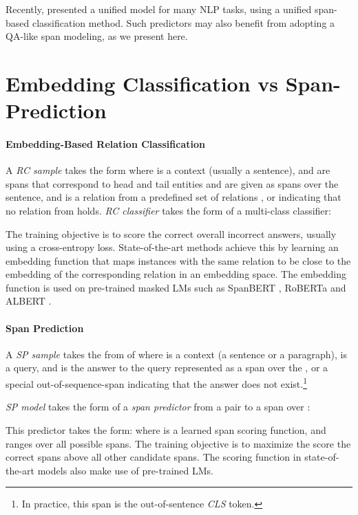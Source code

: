 \documentclass[11pt]{article}
\begin{document}
Recently, \citet{Jiang2019} presented a unified model for many NLP tasks, using a unified span-based classification method. Such predictors may also benefit from adopting a QA-like span modeling, as we present here.













\section{Embedding Classification vs Span-Prediction}
\paragraph{Embedding-Based Relation Classification} \label{ssec:rc}
A \emph{RC sample} takes the form  where  is a context (usually a sentence),  and  are spans that correspond to head and tail entities and are given as spans over the sentence, and  is a relation from a predefined set of relations , or  indicating that no relation from  holds.
\emph{RC classifier} takes the form of a multi-class classifier:

\noindent The training objective is to score the correct  overall incorrect answers, usually using a cross-entropy loss. State-of-the-art methods \cite{Soares2019} achieve this by learning an embedding function  that maps instances with the same relation to be close to the embedding of the corresponding relation in an embedding space. The embedding function is used on pre-trained masked LMs such as SpanBERT \cite{Joshi2019}, RoBERTa \cite{Liu2019} and ALBERT \cite{Lan2019}.

\paragraph{Span Prediction}
A \emph{SP sample} takes the from of  where  is a context (a sentence or a paragraph),  is a query, and  is the answer to the query represented as a span over the , or a special out-of-sequence-span indicating that the answer does not exist.\footnote{In practice, this span is the out-of-sentence \emph{CLS} token.} 

\noindent\emph{SP model} takes the form of a \emph{span predictor} from a  pair to a span over :

\noindent This predictor takes the form:  
\noindent where  is a learned span scoring function, and  ranges over all possible spans. The training objective is to maximize the score the correct spans above all other candidate spans. The scoring function in state-of-the-art models \cite{McCann2018,He2015,Wu2019} also make use of pre-trained LMs. 
\end{document}
